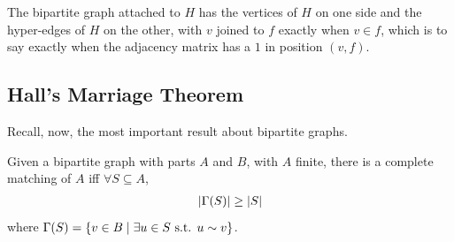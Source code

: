 The bipartite graph attached to $H$ has the vertices of $H$ on one side and the hyper-edges of $H$ on the other, with $v$ joined to $f$ exactly when $v \in f$, which is to say exactly when the adjacency matrix has a $1$ in position $(v, f)$.

\subsection{Hall's Marriage Theorem}

Recall, now, the most important result about bipartite graphs.

\begin{boxtheorem} \label{Ch3:Thm:Hall}
    Given a bipartite graph with parts $A$ and $B$, with $A$ finite, there is a complete matching of $A$ iff $\forall S \subseteq A$,
    \begin{align*}
        \left\lvert \Gamma(S) \right\rvert \geq \left\lvert S \right\rvert
    \end{align*}
    where $\Gamma(S) = \left\{ v \in B \; \middle\vert \; \exists u \in S \text{ s.t. } u \sim v \right\}$.
\end{boxtheorem}

